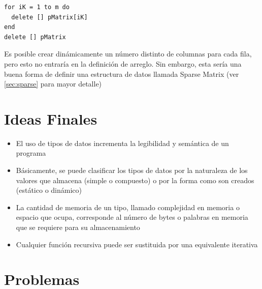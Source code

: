 \begin{lstlisting}[upquote=true, language=pseudo]
for iK = 1 to m do
  delete [] pMatrix[iK]
end
delete [] pMatrix
\end{lstlisting}

Es posible crear dinámicamente un número distinto de columnas para cada fila, pero esto no entraría en la definición de arreglo. Sin embargo, esta sería una buena forma de definir una estructura de datos llamada Sparse Matrix (ver \ref{sec:sparse} para mayor detalle)

\section{Ideas Finales}

\begin{itemize}
\item El uso de tipos de datos incrementa la legibilidad y semántica de un programa
\item Básicamente, se puede clasificar los tipos de datos por la naturaleza de los valores que almacena (simple o compuesto) o por la forma como son creados (estático o dinámico)
\item La cantidad de memoria de un tipo, llamado complejidad en memoria o espacio que ocupa, corresponde al número de bytes o palabras en memoria que se requiere para su almacenamiento
\item Cualquier función recursiva puede ser sustituida por una equivalente iterativa
\end{itemize}

\section{Problemas}

